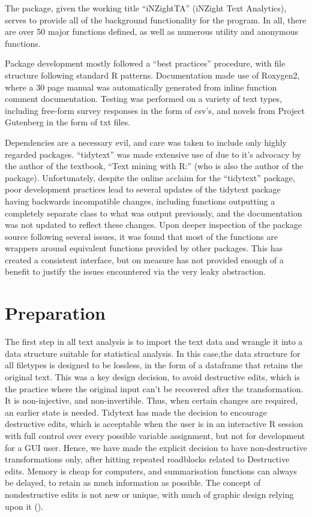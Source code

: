 \message{ !name(jason-cairns-dissertation.tex)}\documentclass[11pt, a4paper, titlepage]{report}
\begin{document}
The package, given the working title ``iNZightTA'' (iNZight Text
Analytics), serves to provide all of the background functionality for
the program. In all, there are over 50 major functions defined, as
well as numerous utility and anonymous functions.

Package development mostly followed a ``best practices'' procedure,
with file structure following standard R patterns. Documentation made
use of Roxygen2\autocite{wickham18roxy}, where a 30 page manual was
automatically generated from inline function comment documentation.
Testing was performed on a variety of text types, including free-form
survey responses in the form of csv's, and novels from Project
Gutenberg in the form of txt files.

Dependencies are a necessary evil, and care was taken to include only
highly regarded packages. ``tidytext'' was made extensive use of due
to it's advocacy by the author of the textbook, ``Text mining with
R:'' (who is also the author of the package). Unfortunately, despite
the online acclaim for the ``tidytext'' package, poor development
practices lead to several updates of the tidytext package having
backwards incompatible changes, including functions outputting a
completely separate class to what was output previously, and the
documentation was not updated to reflect these changes. Upon deeper
inspection of the package source following several issues, it was
found that most of the functions are wrappers around equivalent
functions provided by other packages. This has created a consistent
interface, but on measure has not provided enough of a benefit to
justify the issues encountered via the very leaky abstraction.

\section{Preparation}\label{sec:import}

The first step in all text analysis is to import the text data and
wrangle it into a data structure suitable for statistical analysis. In
this case,the data structure for all filetypes is designed to be
lossless, in the form of a dataframe that retains the original text.
This was a key design decision, to avoid destructive edits, which is
the practice where the original input can't be recovered after the
transformation. It is non-injective, and non-invertible. Thus, when
certain changes are required, an earlier state is needed. Tidytext has
made the decision to encourage destructive edits, which is acceptable
when the user is in an interactive R session with full control over
every possible variable assignment, but not for development for a GUI
user. Hence, we have made the explicit decision to have
non-destructive transformations only, after hitting repeated
roadblocks related to Destructive edits. Memory is cheap for
computers, and summarisation functions can always be delayed, to
retain as much information as possible. The concept of nondestructive
edits is not new or unique, with much of graphic design relying upon it
(\autocite{inc.:_nondes_editin_photos}).
\end{document}
